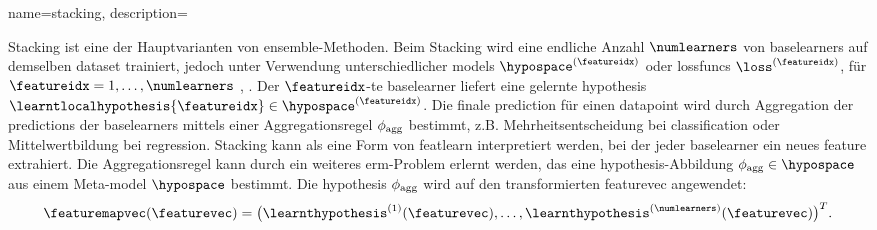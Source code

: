 {{{{
{
    name={stacking},
    description={Stacking ist eine der Hauptvarianten von \gls{ensemble}-Methoden.  
        Beim Stacking wird eine endliche Anzahl $\numlearners$ von \glspl{baselearner} auf demselben 
        \gls{dataset} trainiert, jedoch unter Verwendung unterschiedlicher \glspl{model} 
        $\hypospace^{(\featureidx)}$ oder \glspl{lossfunc} $\loss^{(\featureidx)}$, für 
        $\featureidx=1,\ldots,\numlearners$ \cite[Ch. 8.8]{hastie01statisticallearning},
        \cite{WOLPERT1992241,ZhouEnsemble2012}. 
        Der $\featureidx$-te \gls{baselearner} liefert eine gelernte \gls{hypothesis} 
        $\learntlocalhypothesis{\featureidx} \in \hypospace^{(\featureidx)}$. 
        Die finale \gls{prediction} für einen \gls{datapoint} wird durch Aggregation der 
        \glspl{prediction} der \glspl{baselearner} mittels einer Aggregationsregel 
        $\phi_{\rm agg}$ bestimmt, z.B. Mehrheitsentscheidung bei \gls{classification} 
        oder Mittelwertbildung bei \gls{regression}. 
        Stacking kann als eine Form von \gls{featlearn} interpretiert werden, bei der jeder 
        \gls{baselearner} ein neues \gls{feature} extrahiert. Die Aggregationsregel kann 
        durch ein weiteres \gls{erm}-Problem erlernt werden, das eine \gls{hypothesis}-Abbildung 
        $\phi_{\rm agg} \in \hypospace$ aus einem Meta-\gls{model} $\hypospace$ bestimmt. 
        Die \gls{hypothesis} $\phi_{\rm agg}$ wird auf den transformierten 
        \gls{featurevec} angewendet:
        $$\featuremapvec(\featurevec)= \big( \learnthypothesis^{(1)}(\featurevec), 
       \ldots, \learnthypothesis^{(\numlearners)}(\featurevec) \big)^{T}.$$
       \begin{figure}[htbp]
        \begin{center}
\end{center}
\end{figure}}}}}}}
